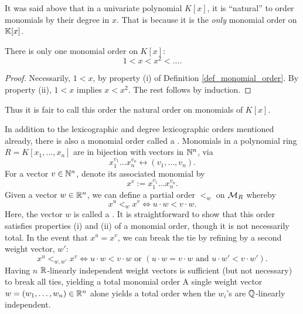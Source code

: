 It was said above that in a univariate polynomial $K[x]$,
it is ``natural'' to order monomials by their degree in $x$.
That is because it is the \emph{only} monomial order on $\bb K[x]$.
\begin{proposition}
  There is only one monomial order on $K[x]$:
  \[ 1 < x < x^2 < \dots. \]
\end{proposition}
\begin{proof}
\begin{comment}
  Let $(\cal M, \leq)$ be a monomial order on powers of $x$.
  We show by induction that $x^n < x^{n+1}$ for all natural numbers $n$.

  By property (i), $1 < x$, establishing the base case, $x^0 < x^1$.
  Now suppose $x^k < x^{k+1}$ for some natural number $k \geq 0$.
  By property (ii), $x^kx < x^{k+1}x$, hence $x^{k+1} < x^{k+2}$.
\end{comment}
  Necessarily, $1 < x$, by property (i) of Definition \ref{def_monomial_order}.
  By property (ii), $1 < x$ implies $x < x^2$. The rest follows by induction.
\end{proof}
Thus it is fair to call this order the natural order on monomials of $K[x]$.

In addition to the lexicographic and degree lexicographic orders mentioned already,
there is also a monomial order called a .
Monomials in a polynomial ring $R = K[x_1, \ldots, x_n]$ are in bijection with vectors in $\bb N^n$, via
\[ x_1^{v_1} \dots x_n^{v_n} \longleftrightarrow (v_1, \ldots, v_n). \]
For a vector $v \in \bb N^n$, denote its associated monomial by 
\[ x^v := x_1^{v_1} \dots x_n^{v_n}. \]
Given a vector $w \in \bb R^n$, we can define a partial order $<_w$ on $\cal M_R$ whereby
\[ x^u <_w x^v \iff u \cdot w < v \cdot w. \]
Here, the vector $w$ is called a .
It is straightforward to show that this order satisfies properties (i) and (ii) of a monomial order, though it is not necessarily total.
In the event that $x^u = x^v$, we can break the tie by refining by a second weight vector, $w'$:
\[ x^u <_{w,w'} x^v \iff u \cdot w < v \cdot w \text{ or }(u \cdot w = v \cdot w \text{ and } u \cdot w' < v \cdot w'). \]
Having $n$ $\bb R$-linearly independent weight vectors is sufficient (but not necessary) to break all ties, yielding a total monomial order
A single weight vector $w = (w_1, \ldots, w_n) \in \bb R^n$ alone yields a total order when the $w_i$'s are $\bb Q$-linearly independent. 

